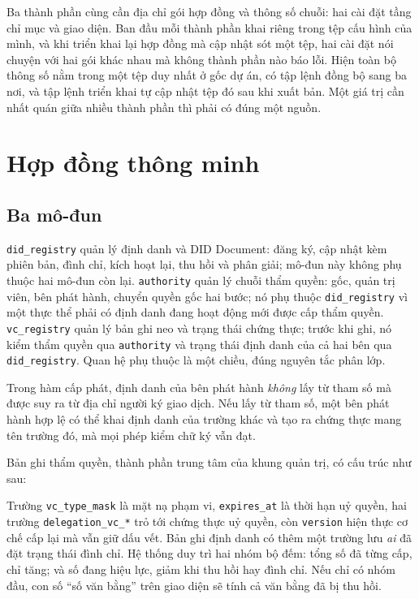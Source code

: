 Ba thành phần cùng cần địa chỉ gói hợp đồng và thông số chuỗi: hai cài đặt tầng chỉ mục và giao diện. Ban đầu mỗi thành phần khai riêng trong tệp cấu hình của mình, và khi triển khai lại hợp đồng mà cập nhật sót một tệp, hai cài đặt nói chuyện với hai gói khác nhau mà không thành phần nào báo lỗi. Hiện toàn bộ thông số nằm trong một tệp duy nhất ở gốc dự án, có tập lệnh đồng bộ sang ba nơi, và tập lệnh triển khai tự cập nhật tệp đó sau khi xuất bản. Một giá trị cần nhất quán giữa nhiều thành phần thì phải có đúng một nguồn.

\section{Hợp đồng thông minh}
\label{sec:hop-dong}

\subsection{Ba mô-đun}

\texttt{did\_registry} quản lý định danh và DID Document: đăng ký, cập nhật kèm phiên bản, đình chỉ, kích hoạt lại, thu hồi và phân giải; mô-đun này không phụ thuộc hai mô-đun còn lại. \texttt{authority} quản lý chuỗi thẩm quyền: gốc, quản trị viên, bên phát hành, chuyển quyền gốc hai bước; nó phụ thuộc \texttt{did\_registry} vì một thực thể phải có định danh đang hoạt động mới được cấp thẩm quyền. \texttt{vc\_registry} quản lý bản ghi neo và trạng thái chứng thực; trước khi ghi, nó kiểm thẩm quyền qua \texttt{authority} và trạng thái định danh của cả hai bên qua \texttt{did\_registry}. Quan hệ phụ thuộc là một chiều, đúng nguyên tắc phân lớp.

Trong hàm cấp phát, định danh của bên phát hành \emph{không} lấy từ tham số mà được suy ra từ địa chỉ người ký giao dịch. Nếu lấy từ tham số, một bên phát hành hợp lệ có thể khai định danh của trường khác và tạo ra chứng thực mang tên trường đó, mà mọi phép kiểm chữ ký vẫn đạt.

Bản ghi thẩm quyền, thành phần trung tâm của khung quản trị, có cấu trúc như sau:



Trường \texttt{vc\_type\_mask} là mặt nạ phạm vi, \texttt{expires\_at} là thời hạn uỷ quyền, hai trường \texttt{delegation\_vc\_*} trỏ tới chứng thực uỷ quyền, còn \texttt{version} hiện thực cơ chế cấp lại mà vẫn giữ dấu vết. Bản ghi định danh có thêm một trường lưu \emph{ai} đã đặt trạng thái đình chỉ. Hệ thống duy trì hai nhóm bộ đếm: tổng số đã từng cấp, chỉ tăng; và số đang hiệu lực, giảm khi thu hồi hay đình chỉ. Nếu chỉ có nhóm đầu, con số ``số văn bằng'' trên giao diện sẽ tính cả văn bằng đã bị thu hồi.

